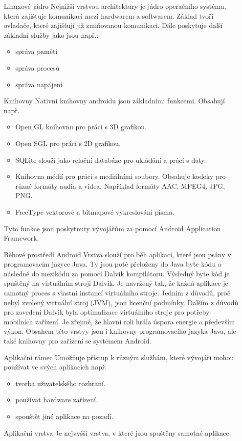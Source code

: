 \documentclass[12pt]{article}
\begin{document}
\begin{itemize}
\item[Linuxové jádro] Nejnižší vrstvou architektury je jádro operačního systému, která zajišťuje komunikaci mezi hardwarem a softwarem. Základ tvoří ovladače, které zajišťují již zmiňovanou komunikaci. Dále poskytuje další základní služby jako jsou např.:
\begin{itemize}
\item správa paměti
\item správa procesů
\item správa napájení
\end{itemize}
\item[Knihovny] Nativní knihovny androidu jsou základními funkcemi. Obsahují např. 
\begin{itemize}
\item Open GL knihovnu pro práci s 3D grafikou.
\item Open SGL pro práci s 2D grafikou.
\item SQLite slouží jako relační databáze pro ukládání a práci s daty.
\item Knihovna médií pro práci s mediálními soubory. Obsahuje kodeky pro různé formáty audia a videa. Například formáty AAC, MPEG4, JPG, PNG.
\item FreeType vektorové a bitmapové vykreslování písma.
\end{itemize}
Tyto funkce jsou poskytnuty vývojářům za pomocí Android Application Framework.
\item[Běhové prostředí Android] Vrstva slouží pro běh aplikací, které jsou psány v programovacím jazyce Java. Ty jsou poté přeloženy do Java byte kódu a následně do mezikódu za pomocí Dalvik kompilátoru. Výsledný byte kód je spuštěný na virtuálním stroji Dalvik. Je navržený tak, že každá aplikace je samotný proces s vlastní instancí virtuálního stroje. Jedním z důvodů, proč nebyl zvolený virtuální stroj (JVM), jsou licenční podmínky. Dalším z důvodů pro zavedení Dalvik byla optimalizace virtuálního stroje pro potřeby mobilních zařízení. Je zřejmé, že hlavní roli hrála úspora energie a především výkon.
Obsahem této vrstvy jsou i knihovny programovacího jazyka Java, ale také knihovny pro zařízení se systémem Android.
\item[Aplikační rámec] Umožňuje přístup k různým službám, které vývojáři mohou používat ve svých aplikacích např.
\begin{itemize}
\item tvorba uživatelského rozhraní.
\item používat hardware zařízení.
\item spouštět jiné aplikace na pozadí.
\end{itemize}
\item[Aplikační vrstva] Je nejvyšší vrstva, v které jsou spuštěny samotné aplikace.
\end{itemize}
\end{document}
